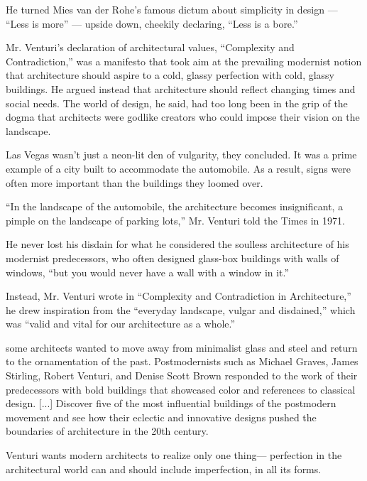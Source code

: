     He turned Mies van der Rohe’s famous dictum about simplicity in design — “Less is more” — upside down, cheekily declaring, “Less is a bore.”\cite{Schudel2018}

    Mr. Venturi’s declaration of architectural values, “Complexity and Contradiction,” was a manifesto that took aim at the prevailing modernist notion that architecture should aspire to a cold, glassy perfection with cold, glassy buildings.
    He argued instead that architecture should reflect changing times and social needs.
    The world of design, he said, had too long been in the grip of the dogma that architects were godlike creators who could impose their vision on the landscape.\cite{Schudel2018}

     Las Vegas wasn’t just a neon-lit den of vulgarity, they concluded.
     It was a prime example of a city built to accommodate the automobile.
     As a result, signs were often more important than the buildings they loomed over.\cite{Schudel2018}

    “In the landscape of the automobile, the architecture becomes insignificant, a pimple on the landscape of parking lots,” Mr. Venturi told the Times in 1971.\cite{Schudel2018}

    He never lost his disdain for what he considered the soulless architecture of his modernist predecessors, who often designed glass-box buildings with walls of windows, “but you would never have a wall with a window in it.”\cite{Schudel2018}

    Instead, Mr. Venturi wrote in “Complexity and Contradiction in Architecture,” he drew inspiration from the “everyday landscape, vulgar and disdained,” which was “valid and vital for our architecture as a whole.”\cite{Schudel2018}

    some architects wanted to move away from minimalist glass and steel and return to the ornamentation of the past. Postmodernists such as Michael Graves, James Stirling, Robert Venturi, and Denise Scott Brown responded to the work of their predecessors with bold buildings that showcased color and references to classical design. [...] Discover five of the most influential buildings of the postmodern movement and see how their eclectic and innovative designs pushed the boundaries of architecture in the 20th century\cite{Stamp2016}.

    Venturi wants modern architects to realize only one thing— perfection in the architectural world can and should include imperfection, in all its forms\cite{Lutolli2020}.

